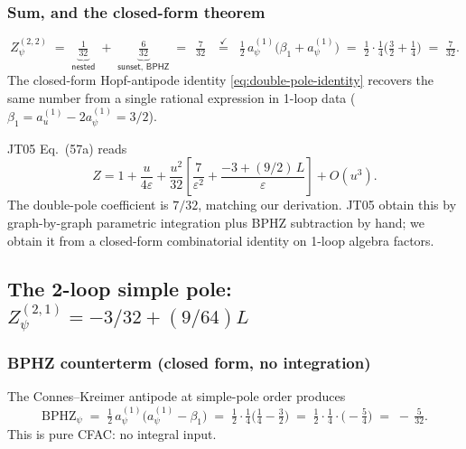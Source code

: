 \documentclass[11pt,a4paper]{article}
\theoremstyle{definition}
\theoremstyle{plain}
\begin{document}
\subsubsection{Sum, and the closed-form theorem}

\begin{cfacbox}
\begin{equation}\label{eq:zpsi-22-walk}
  Z_\psi^{(2,2)}
  \;=\;
  \underbrace{\tfrac{1}{32}}_{\textsf{nested}}
  \;+\;
  \underbrace{\tfrac{6}{32}}_{\textsf{sunset, BPHZ}}
  \;=\;
  \boxed{\,\tfrac{7}{32}\,}
  \;\;\stackrel{\checkmark}{=}\;\;
  \tfrac{1}{2}\,a_\psi^{(1)}\bigl(\beta_1 + a_\psi^{(1)}\bigr)
  \;=\; \tfrac{1}{2}\cdot \tfrac{1}{4}\bigl(\tfrac{3}{2} + \tfrac{1}{4}\bigr)
  \;=\; \tfrac{7}{32}.
\end{equation}
The closed-form Hopf-antipode identity \eqref{eq:double-pole-identity}
recovers the same number from a single rational expression in
1-loop data ($\beta_1 = a_u^{(1)} - 2 a_\psi^{(1)} = 3/2$).
\end{cfacbox}

\begin{stdbox}
JT05 Eq.~(57a) reads
\[
  Z = 1 + \frac{u}{4\varepsilon} + \frac{u^2}{32}\!\left[
       \frac{7}{\varepsilon^2}
       + \frac{-3 + (9/2)\,L}{\varepsilon}\right] + O(u^3).
\]
The double-pole coefficient is $7/32$, matching our derivation.
JT05 obtain this by graph-by-graph parametric integration plus BPHZ
subtraction by hand; we obtain it from a closed-form combinatorial
identity on 1-loop algebra factors.
\end{stdbox}

\subsection{The 2-loop simple pole: $Z_\psi^{(2,1)} = -3/32 + (9/64)L$}
\label{app:2loop-simple}

\subsubsection{BPHZ counterterm (closed form, no integration)}

\begin{cfacbox}
The Connes--Kreimer antipode at simple-pole order produces
\begin{equation}\label{eq:bphz-walk}
  \mathrm{BPHZ}_\psi
  \;=\; \tfrac{1}{2}\,a_\psi^{(1)}\bigl(a_\psi^{(1)} - \beta_1\bigr)
  \;=\; \tfrac{1}{2}\cdot \tfrac{1}{4}\bigl(\tfrac{1}{4} - \tfrac{3}{2}\bigr)
  \;=\; \tfrac{1}{2}\cdot\tfrac{1}{4}\cdot\bigl(-\tfrac{5}{4}\bigr)
  \;=\; -\,\tfrac{5}{32}.
\end{equation}
This is pure CFAC: no integral input.
\end{cfacbox}
\end{document}
